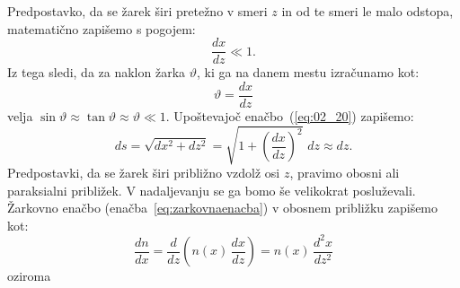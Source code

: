 Predpostavko, da se žarek širi pretežno v smeri $z$ in od te smeri 
le malo odstopa, matematično zapišemo s pogojem:
\begin{equation}
 \frac{dx}{dz}\ll 1.
  \label{eq:02_20}
\end{equation}
Iz tega sledi, da za naklon žarka $\vartheta$, ki ga na danem mestu izračunamo kot:
\begin{equation}
\vartheta = \frac{dx}{dz}
 \label{eq:02_21}
\end{equation}
velja $\sin \vartheta \approx \tan \vartheta \approx \vartheta \ll 1$.
Upoštevajoč enačbo~(\ref{eq:02_20}) zapišemo:
\begin{equation}
ds = \sqrt{dx^2+dz^2} = \sqrt{1+\left(\frac{dx}{dz}\right)^2}\,\,dz \approx dz.
\label{eq:02_22}
\end{equation}
Predpostavki, da se žarek širi približno vzdolž osi $z$, pravimo
obosni ali paraksialni približek. V nadaljevanju se ga bomo še velikokrat 
posluževali. Žarkovno enačbo (enačba~\ref{eq:zarkovnaenacba}) v obosnem približku
zapišemo kot:
\begin{equation}
 \frac{dn}{dx} = \frac{d}{dz}\left(n(x)\,\frac{dx}{dz}\right) = n(x)\,\frac{d^2x}{dz^2}
  \label{eq:02_23}
\end{equation}
oziroma

